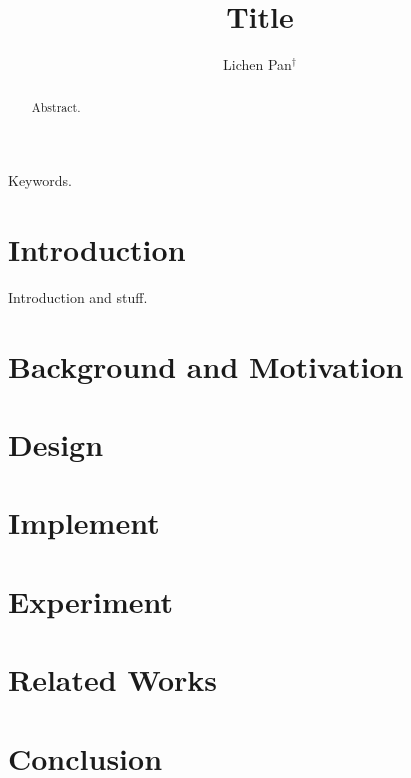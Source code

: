 \documentclass[conference]{IEEEtran}
\begin{document}
\title{Title}


\author{Lichen Pan$^\dagger$}

\maketitle

\begin{abstract}
	Abstract.
\end{abstract}

\begin{IEEEkeywords}
	Keywords.
\end{IEEEkeywords}

\section{Introduction}
\label{sec:introduction}
Introduction and stuff\cite{IEEEhowto:IEEEtranpage}.


\section{Background and Motivation}
\label{sec:background}

\section{Design}
\label{sec:design}

\section{Implement}
\label{sec:implement}

\section{Experiment}
\label{sec:experiment}

\section{Related Works}
\label{sec:related}

\section{Conclusion}
\label{sec:conclusion}



\end{document}
